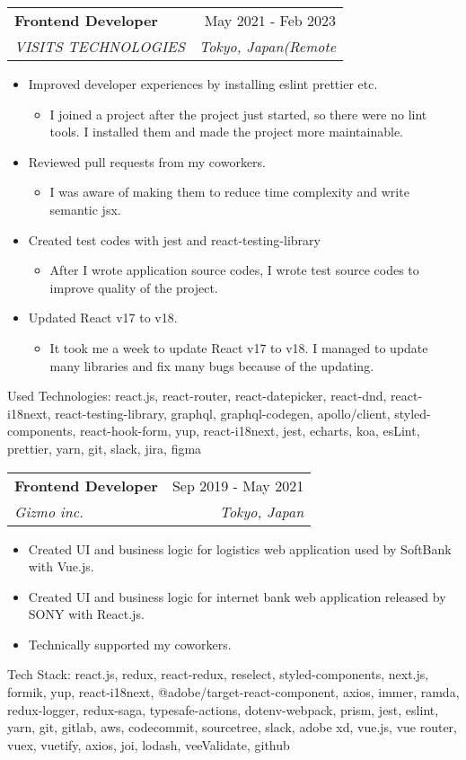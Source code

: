 \documentclass[letterpaper,11pt]{article}
\makeatletter
\newcommand{\resumeItem}[1]{
  \item\large{
    {#1 \vspace{0pt}}
  }
}
\newcommand{\resumeSubheading}[4]{
  \vspace{-2pt}\item
    \begin{tabular*}{0.97\textwidth}[t]{l@{\extracolsep{\fill}}r}
      \textbf{#1} & #2 \\
      \textit{\small#3} & \textit{\small #4} \\
    \end{tabular*}\vspace{-7pt}
}
\makeatother
\begin{document}
    \resumeSubheading
      {Frontend Developer}{May 2021 - Feb 2023}
      {VISITS TECHNOLOGIES}{Tokyo, Japan(Remote}
      \begin{itemize}
        \resumeItem{Improved developer experiences by installing eslint prettier etc.}
        \begin{itemize}
          \item {I joined a project after the project just started, so there were no lint tools. I installed them and made the project more maintainable.}
        \end{itemize}
        \resumeItem{Reviewed pull requests from my coworkers.}
        \begin{itemize}
          \item {I was aware of making them to reduce time complexity and write semantic jsx.}
        \end{itemize}
        \resumeItem{Created test codes with jest and react-testing-library}
        \begin{itemize}
          \item {After I wrote application source codes, I wrote test source codes to improve quality of the project.}
        \end{itemize}
        \resumeItem{Updated React v17 to v18.}
        \begin{itemize}
          \item {It took me a week to update React v17 to v18. I managed to update many libraries and fix many bugs because of the updating.}
        \end{itemize}
      \end{itemize}
      {Used Technologies: react.js, react-router, react-datepicker, react-dnd, react-i18next, react-testing-library, graphql, graphql-codegen, apollo/client, styled-components, react-hook-form, yup, react-i18next, jest, echarts, koa, esLint, prettier, yarn, git, slack, jira, figma}

    \resumeSubheading
      {Frontend Developer}{Sep 2019 - May 2021}
      {Gizmo inc.}{Tokyo, Japan}
      \begin{itemize}
        \resumeItem{Created UI and business logic for logistics web application used by SoftBank with Vue.js.}
        \resumeItem{Created UI and business logic for internet bank web application released by SONY with React.js.}
        \resumeItem{Technically supported my coworkers.}
      \end{itemize}
      {Tech Stack: react.js, redux, react-redux, reselect, styled-components, next.js, formik, yup, react-i18next, @adobe/target-react-component, axios, immer, ramda, redux-logger, redux-saga, typesafe-actions, dotenv-webpack, prism, jest, eslint, yarn, git, gitlab, aws, codecommit, sourcetree, slack, adobe xd, vue.js, vue router, vuex, vuetify, axios, joi, lodash, veeValidate, github}
\end{document}

